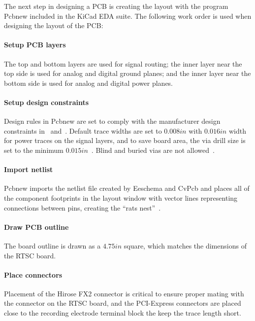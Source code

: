 The next step in designing a PCB is creating the layout with the program Pcbnew included in the KiCad EDA suite.  The following work order is used when designing the layout of the PCB:

\paragraph{Setup PCB layers}

The top and bottom layers are used for signal routing; the inner layer near the top side is used for analog and digital ground planes; and the inner layer near the bottom side is used for analog and digital power planes.

\paragraph{Setup design constraints}
	
Design rules in Pcbnew are set to comply with the manufacturer design constraints in~\cite{AdvCir66} and~\cite{AdvCirTol}. Default trace widths are set to $0.008\unit{in}$ with $0.016\unit{in}$ width for power traces on the signal layers, and to save board area, the via drill size is set to the minimum $0.015\unit{in}$~\cite{AdvCir66}.  Blind and buried vias are not allowed~\cite{AdvCir66}.
	
\paragraph{Import netlist}

Pcbnew imports the netlist file created by Eeschema and CvPcb and places all of the component footprints in the layout window with vector lines representing connections between pins, creating the ``rats nest''~\cite{PcbnewRefMan}.

\paragraph{Draw PCB outline}

The board outline is drawn as a $4.75\unit{in}$ square, which matches the dimensions of the RTSC board.  

\paragraph{Place connectors}

Placement of the Hirose FX2 connector is critical to ensure proper mating with the connector on the RTSC board, and the PCI-Express connectors are placed close to the recording electrode terminal block the keep the trace length short.
	
